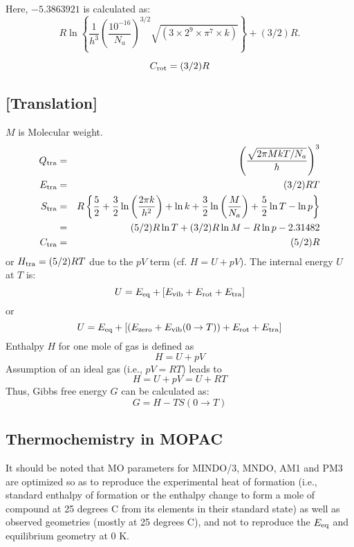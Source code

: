 \documentclass[a4paper]{book}
\newcommand{\mi}[1]{#1\index{#1}}
\begin{document}
Here, $-5.386 3921$ is calculated as:
$$ R \ln\left\{\frac{1}{h^3} \left(\frac{10^{-16}}{N_a}\right)^{3/2} 
\sqrt{(3\times 2^9 \times \pi^7 \times k)}\right\} + (3/2)R.
$$

\begin{equation}
C_{\rm rot} = (3/2)R \label{eq18}
\end{equation}

\subsection*{[Translation]}
$M$ is Molecular weight.
\begin{eqnarray}
Q_{\rm tra} & = & \left( \frac{\sqrt{2\pi MkT/N_a}}{h}\right)^3
\label{eq19} \\
E_{\rm tra} & = & (3/2)RT                            \label{eq20} \\
S_{\rm tra} & = & R\left\{ \frac{5}{2} + 
\frac{3}{2}\ln\left(\frac{2\pi k}{h^2}\right) + \ln k + 
\frac{3}{2}\ln\left(\frac{M}{N_a}\right) + \frac{5}{2}\ln T - \ln p \right\}
\label{eq21} \\
            & = & (5/2)R\ln T + (3/2)R\ln M - R\ln p - 2.31482 \label{eq22}\\
C_{\rm tra} & = & (5/2)R                              \label{eq23}
\end{eqnarray}
or  $H_{\rm tra} = (5/2)RT$  due to the $pV$ term (cf.  $H = U + pV$).
The internal energy $U$ at $T$ is:
\begin{equation}
U = E_{\rm eq} + [E_{\rm vib} + E_{\rm rot} + E_{\rm tra}] \label{eq24}
\end{equation}
or
\begin{equation}
U = E_{\rm eq} + [(E_{\rm zero} + E_{\rm vib}(0\rightarrow T)) 
  + E_{\rm rot} + E_{\rm tra}]  \label{eq25}
\end{equation}
Enthalpy $H$ for one mole of gas is defined as
\begin{equation}
H = U + pV     \label{eq26}
\end{equation}
Assumption of an ideal gas (i.e.,  $pV = RT$) leads to
\begin{equation}
H = U + pV = U + RT  \label{eq27} 
\end{equation}
Thus, \mi{Gibbs free energy} $G$ can be calculated as:
\begin{equation}
           G = H - T S(0\rightarrow T) \label{eq28}
\end{equation}

\subsection*{Thermochemistry in MOPAC}
It should be noted that MO parameters for MINDO/3,  MNDO,  AM1  and
PM3  are optimized so as to reproduce the experimental heat of formation
(i.e., standard enthalpy of formation or the enthalpy change to  form  a
mole  of  compound  at  25 degrees C from its elements in their standard
state) as well as observed geometries (mostly at 25 degrees C), and  not
to reproduce the $E_{\rm eq}$ and equilibrium geometry at 0 K.
\end{document}
